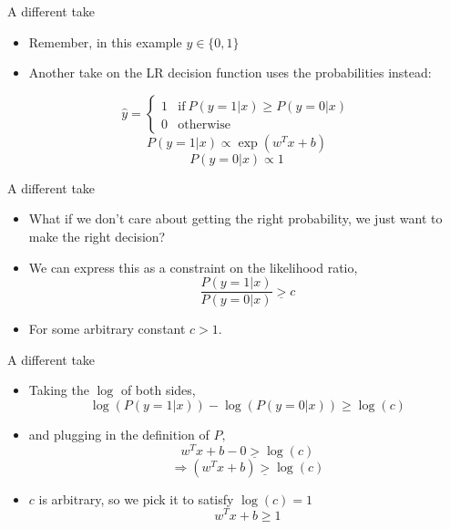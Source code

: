 \documentclass[12pt,notes,mathserif]{beamer}
\providecommand{\tightlist}{%
	\setlength{\itemsep}{0pt}\setlength{\parskip}{0pt}}
\begin{document}
\begin{frame}{A different take}

\begin{itemize}
\item
  Remember, in this example \(y\in\{0,1\}\)
\item
  Another take on the LR decision function uses the probabilities
  instead:
\end{itemize}

\[\hat{y}=\left\{\begin{array}{ll}
1 & \text{if}\ P(y=1|x)\geq P(y=0|x)\\
0 & \text{otherwise}
\end{array}\right.\] \[
P(y=1|x)\propto\exp(w^{T}x+b)
\] \[
P(y=0|x)\propto 1
\]

\end{frame}

\begin{frame}{A different take}

\begin{itemize}
\item
  What if we don't care about getting the right probability, we just
  want to make the right decision?
\item
  We can express this as a constraint on the likelihood ratio, \[
  \frac{P(y=1|x)}{P(y=0|x)}\underline{>}c
  \]
\item
  For some arbitrary constant \(c>1.\)
\end{itemize}

\end{frame}

\begin{frame}{A different take}

\begin{itemize}
\tightlist
\item
  Taking the \(\log\) of both sides, \[
  \log(P(y=1|x))-\log(P(y=0|x))\geq\log(c)
  \]
\item
  and plugging in the definition of \(P,\) \[
  w^{T}x+b-0\underline{>}\log(c)
  \] \[
  \Rightarrow(w^{T}x+b)\underline{>}\log(c)
  \]
\item
  \(c\) is arbitrary, so we pick it to satisfy \(\log(c)=1\) \[
  w^{T}x+b\geq 1
  \]
\end{itemize}

\end{frame}
\end{document}
